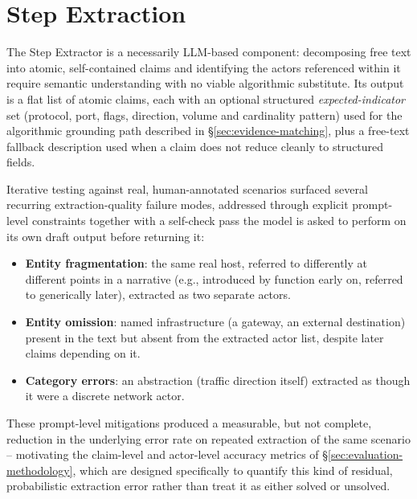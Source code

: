 \documentclass[sigconf,nonacm]{acmart}
\begin{document}
\section{Step Extraction}
\label{sec:step-extraction}

The Step Extractor is a necessarily LLM-based component: decomposing free text
into atomic, self-contained claims and identifying the actors referenced within
it require semantic understanding with no viable algorithmic substitute. Its
output is a flat list of atomic claims, each with an optional structured
\emph{expected-indicator} set (protocol, port, flags, direction, volume and
cardinality pattern) used for the algorithmic grounding path described in
\S\ref{sec:evidence-matching}, plus a free-text fallback description used when a
claim does not reduce cleanly to structured fields.

Iterative testing against real, human-annotated scenarios surfaced several
recurring extraction-quality failure modes, addressed through explicit
prompt-level constraints together with a self-check pass the model is asked to
perform on its own draft output before returning it:

\begin{itemize}
  \item \textbf{Entity fragmentation}: the same real host, referred to differently at different points in a narrative (e.g., introduced by function early on, referred to generically later), extracted as two separate actors.
  \item \textbf{Entity omission}: named infrastructure (a gateway, an external destination) present in the text but absent from the extracted actor list, despite later claims depending on it.
  \item \textbf{Category errors}: an abstraction (traffic direction itself) extracted as though it were a discrete network actor.
\end{itemize}

These prompt-level mitigations produced a measurable, but not complete,
reduction in the underlying error rate on repeated extraction of the same
scenario -- motivating the claim-level and actor-level accuracy metrics of
\S\ref{sec:evaluation-methodology}, which are designed specifically to quantify
this kind of residual, probabilistic extraction error rather than treat it as
either solved or unsolved.

\end{document}
